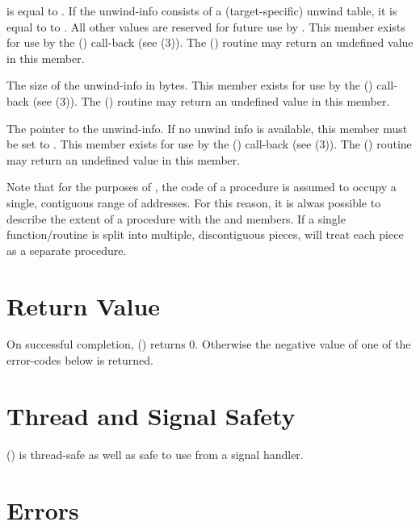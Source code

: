 \documentclass{article}
\begin{document}
\begin{description}
   is equal to .  If the
  unwind-info consists of a (target-specific) unwind table, it is
  equal to to .  All other values are
  reserved for future use by .  This member exists
  for use by the () call-back (see
  (3)).  The
  () routine
  may return an undefined value in this member. \\
\item[\Type{int} \Var{unwind\_info\_size}] The size of the unwind-info
  in bytes.  This member exists for use by the
  () call-back (see
  (3)).  The
  () routine
  may return an undefined value in this member.\\
\item[\Type{void~*}\Var{unwind\_info}] The pointer to the unwind-info.
  If no unwind info is available, this member must be set to
  .  This member exists for use by the
  () call-back (see
  (3)).  The
  () routine
  may return an undefined value in this member.\\
\end{description}
Note that for the purposes of , the code of a
procedure is assumed to occupy a single, contiguous range of
addresses.  For this reason, it is alwas possible to describe the
extent of a procedure with the  and 
members.  If a single function/routine is split into multiple,
discontiguous pieces,  will treat each piece as a
separate procedure.

\section{Return Value}

On successful completion, () returns 0.
Otherwise the negative value of one of the error-codes below is
returned.

\section{Thread and Signal Safety}

() is thread-safe as well as safe to use
from a signal handler.

\section{Errors}
\end{document}
